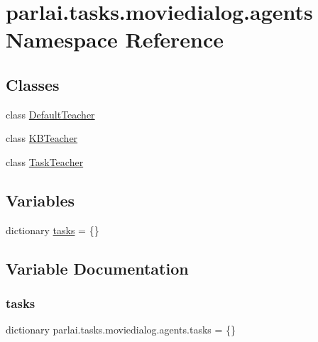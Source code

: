 \hypertarget{namespaceparlai_1_1tasks_1_1moviedialog_1_1agents}{}\section{parlai.\+tasks.\+moviedialog.\+agents Namespace Reference}
\label{namespaceparlai_1_1tasks_1_1moviedialog_1_1agents}
\subsection*{Classes}
\begin{DoxyCompactItemize}
\item 
class \hyperlink{classparlai_1_1tasks_1_1moviedialog_1_1agents_1_1DefaultTeacher}{Default\+Teacher}
\item 
class \hyperlink{classparlai_1_1tasks_1_1moviedialog_1_1agents_1_1KBTeacher}{K\+B\+Teacher}
\item 
class \hyperlink{classparlai_1_1tasks_1_1moviedialog_1_1agents_1_1TaskTeacher}{Task\+Teacher}
\end{DoxyCompactItemize}
\subsection*{Variables}
\begin{DoxyCompactItemize}
\item 
dictionary \hyperlink{namespaceparlai_1_1tasks_1_1moviedialog_1_1agents_a908154750e0a84d5ffc371450d2ee09c}{tasks} = \{\}
\end{DoxyCompactItemize}


\subsection{Variable Documentation}
\mbox{\label{namespaceparlai_1_1tasks_1_1moviedialog_1_1agents_a908154750e0a84d5ffc371450d2ee09c}} 
\subsubsection{\texorpdfstring{tasks}{tasks}}
{\footnotesize\ttfamily dictionary parlai.\+tasks.\+moviedialog.\+agents.\+tasks = \{\}}

